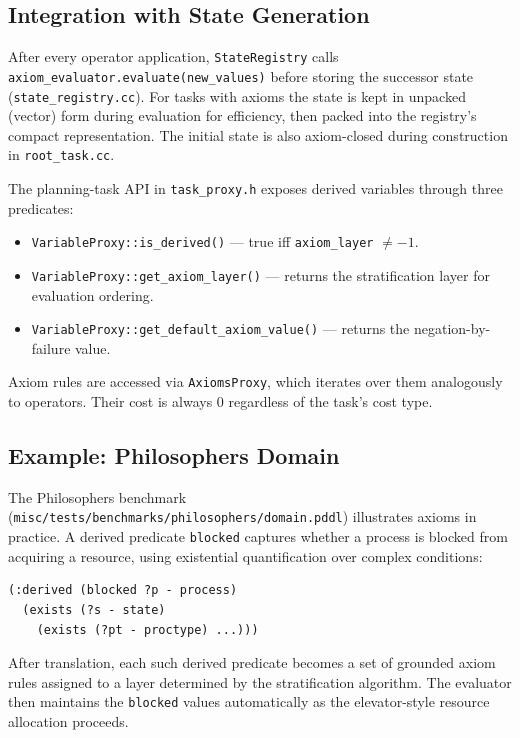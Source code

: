 \documentclass[11pt,a4paper]{article}
\begin{document}
\subsection{Integration with State Generation}

After every operator application, \texttt{StateRegistry} calls
\texttt{axiom\_evaluator.evaluate(new\_values)} before storing the successor
state (\texttt{state\_registry.cc}).  For tasks with axioms the state is kept
in unpacked (vector) form during evaluation for efficiency, then packed into
the registry's compact representation.  The initial state is also axiom-closed
during construction in \texttt{root\_task.cc}.

The planning-task API in \texttt{task\_proxy.h} exposes derived variables
through three predicates:

\begin{itemize}
  \item \texttt{VariableProxy::is\_derived()} --- true iff
        \texttt{axiom\_layer} $\neq -1$.
  \item \texttt{VariableProxy::get\_axiom\_layer()} --- returns the
        stratification layer for evaluation ordering.
  \item \texttt{VariableProxy::get\_default\_axiom\_value()} --- returns the
        negation-by-failure value.
\end{itemize}

Axiom rules are accessed via \texttt{AxiomsProxy}, which iterates over them
analogously to operators.  Their cost is always 0 regardless of the task's
cost type.

\subsection{Example: Philosophers Domain}

The Philosophers benchmark
(\texttt{misc/tests/benchmarks/philosophers/domain.pddl}) illustrates axioms in
practice.  A derived predicate \texttt{blocked} captures whether a process is
blocked from acquiring a resource, using existential quantification over
complex conditions:

\begin{lstlisting}[caption={Derived predicate in Philosophers domain}]
(:derived (blocked ?p - process)
  (exists (?s - state)
    (exists (?pt - proctype) ...)))
\end{lstlisting}

After translation, each such derived predicate becomes a set of grounded axiom
rules assigned to a layer determined by the stratification algorithm.  The
evaluator then maintains the \texttt{blocked} values automatically as the
elevator-style resource allocation proceeds.
\end{document}
